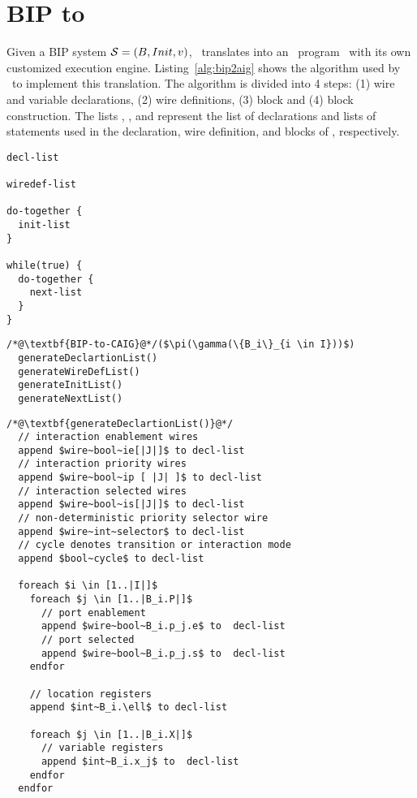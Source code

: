
\section{BIP to \thislanguage}
\label{chap3:bip2aig:bip2etc}
Given a BIP system $\mathcal{S} = (B, Init, v)$, \biptool~translates \Pm into 
an \thislanguage~program \aigcircuit~with its own customized execution engine. 
Listing~\ref{alg:bip2aig} shows the algorithm used by \biptool~to implement 
this translation. The algorithm is divided into 4 steps: (1) wire and variable
declarations, (2) wire definitions, (3)  block and (4)  block construction. 
The lists , ,  and 
represent the list of declarations and lists of statements used in the 
declaration, wire definition,  and  blocks of \aigcircuit, respectively. 



\begin{lstlisting}
decl-list

wiredef-list

do-together {
  init-list
}

while(true) {
  do-together {
    next-list
  }
}
\end{lstlisting}

\begin{lstlisting}
/*@\textbf{BIP-to-CAIG}@*/($\pi(\gamma(\{B_i\}_{i \in I}))$)
  generateDeclartionList()
  generateWireDefList()
  generateInitList()
  generateNextList()
\end{lstlisting}

\begin{lstlisting}
/*@\textbf{generateDeclartionList()}@*/
  // interaction enablement wires
  append $wire~bool~ie[|J|]$ to decl-list
  // interaction priority wires
  append $wire~bool~ip [ |J| ]$ to decl-list 
  // interaction selected wires
  append $wire~bool~is[|J|]$ to decl-list 
  // non-deterministic priority selector wire
  append $wire~int~selector$ to decl-list 
  // cycle denotes transition or interaction mode
  append $bool~cycle$ to decl-list  

  foreach $i \in [1..|I|]$
    foreach $j \in [1..|B_i.P|]$ 
      // port enablement
      append $wire~bool~B_i.p_j.e$ to  decl-list 
      // port selected
      append $wire~bool~B_i.p_j.s$ to  decl-list 
    endfor

    // location registers
    append $int~B_i.\ell$ to decl-list
    
    foreach $j \in [1..|B_i.X|]$ 
      // variable registers
      append $int~B_i.x_j$ to  decl-list 
    endfor
  endfor
\end{lstlisting}


